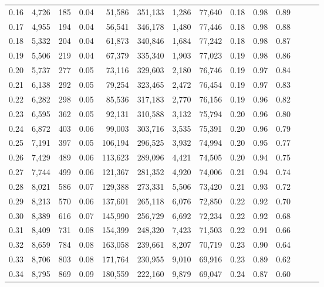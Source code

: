 \begin{tabular}{rrrrrrrrrrrrrr}
0.16 &  4,726 &    185 &  0.04 &   51,586 &  351,133 &   1,286 &  77,640 &  0.18 &  0.98 &      0.89 \\
0.17 &  4,955 &    194 &  0.04 &   56,541 &  346,178 &   1,480 &  77,446 &  0.18 &  0.98 &      0.88 \\
0.18 &  5,332 &    204 &  0.04 &   61,873 &  340,846 &   1,684 &  77,242 &  0.18 &  0.98 &      0.87 \\
0.19 &  5,506 &    219 &  0.04 &   67,379 &  335,340 &   1,903 &  77,023 &  0.19 &  0.98 &      0.86 \\
0.20 &  5,737 &    277 &  0.05 &   73,116 &  329,603 &   2,180 &  76,746 &  0.19 &  0.97 &      0.84 \\
0.21 &  6,138 &    292 &  0.05 &   79,254 &  323,465 &   2,472 &  76,454 &  0.19 &  0.97 &      0.83 \\
0.22 &  6,282 &    298 &  0.05 &   85,536 &  317,183 &   2,770 &  76,156 &  0.19 &  0.96 &      0.82 \\
0.23 &  6,595 &    362 &  0.05 &   92,131 &  310,588 &   3,132 &  75,794 &  0.20 &  0.96 &      0.80 \\
0.24 &  6,872 &    403 &  0.06 &   99,003 &  303,716 &   3,535 &  75,391 &  0.20 &  0.96 &      0.79 \\
0.25 &  7,191 &    397 &  0.05 &  106,194 &  296,525 &   3,932 &  74,994 &  0.20 &  0.95 &      0.77 \\
0.26 &  7,429 &    489 &  0.06 &  113,623 &  289,096 &   4,421 &  74,505 &  0.20 &  0.94 &      0.75 \\
0.27 &  7,744 &    499 &  0.06 &  121,367 &  281,352 &   4,920 &  74,006 &  0.21 &  0.94 &      0.74 \\
0.28 &  8,021 &    586 &  0.07 &  129,388 &  273,331 &   5,506 &  73,420 &  0.21 &  0.93 &      0.72 \\
0.29 &  8,213 &    570 &  0.06 &  137,601 &  265,118 &   6,076 &  72,850 &  0.22 &  0.92 &      0.70 \\
0.30 &  8,389 &    616 &  0.07 &  145,990 &  256,729 &   6,692 &  72,234 &  0.22 &  0.92 &      0.68 \\
0.31 &  8,409 &    731 &  0.08 &  154,399 &  248,320 &   7,423 &  71,503 &  0.22 &  0.91 &      0.66 \\
0.32 &  8,659 &    784 &  0.08 &  163,058 &  239,661 &   8,207 &  70,719 &  0.23 &  0.90 &      0.64 \\
0.33 &  8,706 &    803 &  0.08 &  171,764 &  230,955 &   9,010 &  69,916 &  0.23 &  0.89 &      0.62 \\
0.34 &  8,795 &    869 &  0.09 &  180,559 &  222,160 &   9,879 &  69,047 &  0.24 &  0.87 &      0.60 \\

\end{tabular}
